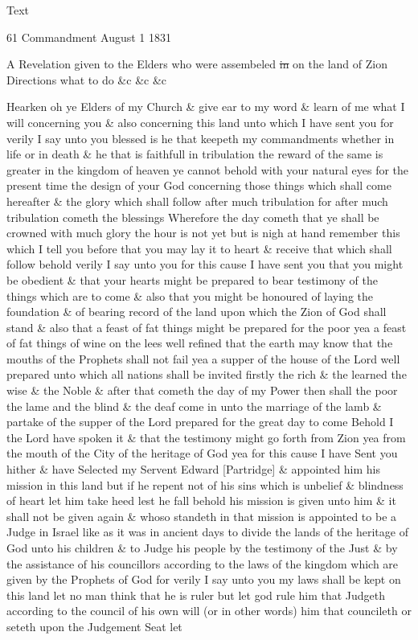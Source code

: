 			\begin{description}
				\item[Text]
			\end{description}
			
				\begin{tightcenter}
				61 Commandment August 1 1831
				\end{tightcenter}
				
				A Revelation given to the Elders who were assembeled \sout{in} on the land of Zion Directions what to do \&c \&c \&c
				
				Hearken oh ye Elders of my Church \& give ear to my word \& learn of me what I will concerning you \& also concerning this land unto which I have sent you for verily I say unto you blessed is he that keepeth my commandments whether in life or in death \& he that is faithfull in tribulation the reward of the same is greater in the kingdom of heaven ye cannot behold with your natural eyes for the present time the design of your God concerning those things which shall come hereafter \& the glory which shall follow after much tribulation for after much tribulation cometh the blessings Wherefore the day cometh that ye shall be crowned with much glory the hour is not yet but is nigh at hand remember this which I tell you before that you may lay it to heart \& receive that which shall follow behold verily I say unto you for this cause I have sent you that you might be obedient \& that your hearts might be prepared to bear testimony of the things which are to come \& also that you might be honoured of laying the foundation \& of bearing record of the land upon which the Zion of God shall stand \& also that a feast of fat things might be prepared for the poor yea a feast of fat things of wine on the lees well refined that the earth may know that the mouths of the Prophets shall not fail yea a supper of the house of the Lord well prepared unto which all nations shall be invited firstly the rich \& the learned the wise \& the Noble \& after that cometh the day of my Power then shall the poor the lame and the blind \& the deaf come in unto the marriage of the lamb \& partake of the supper of the Lord prepared for the great day to come Behold I the Lord have spoken it \& that the testimony might go forth from Zion yea from the mouth of the City of the heritage of God yea for this cause I have Sent you hither \& have Selected my Servent Edward [Partridge] \& appointed him his mission in this land but if he repent not of his sins which is unbelief \& blindness of heart let him take heed lest he fall behold his mission is given unto him \& it shall not be given again \& whoso standeth in that mission is appointed to be a Judge in Israel like as it was in ancient days to divide the lands of the heritage of God unto his children \& to Judge his people by the testimony of the Just \& by the assistance of his councillors according to the laws of the kingdom which are given by the Prophets of God for verily I say unto you my laws shall be kept on this land let no man think that he is ruler but let god rule him that Judgeth according to the council of his own will (or in other words) him that councileth or seteth upon the Judgement Seat let 